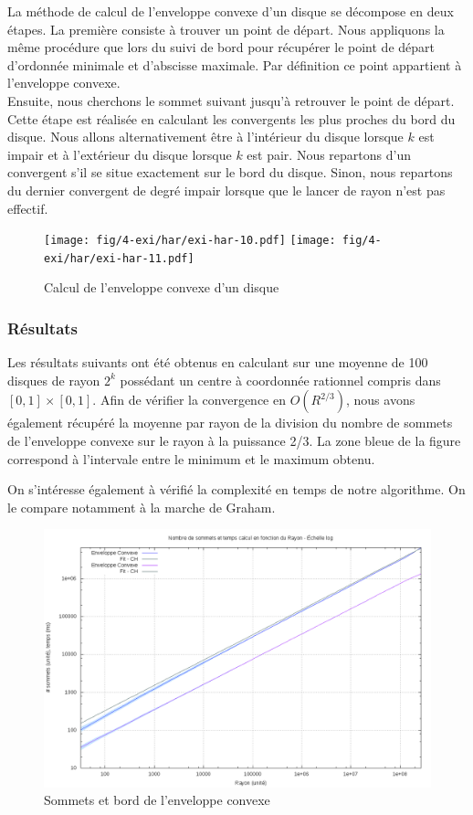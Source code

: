 La méthode de calcul de l'enveloppe convexe d'un disque se décompose en deux étapes. La première consiste à trouver un point de départ. Nous appliquons la même procédure que lors du suivi de bord pour récupérer le point de départ d'ordonnée minimale et d'abscisse maximale. Par définition ce point appartient à l'enveloppe convexe.\\

Ensuite, nous cherchons le sommet suivant jusqu'à retrouver le point de départ. Cette étape est réalisée en calculant les convergents les plus proches du bord du disque. Nous allons alternativement être à l'intérieur du disque lorsque $k$ est impair et à l'extérieur du disque lorsque $k$ est pair. Nous repartons d'un convergent s'il se situe exactement sur le bord du disque. Sinon, nous repartons du dernier convergent de degré impair lorsque que le lancer de rayon n'est pas effectif.\\

\begin{figure}[H]
  \centering
  \texttt{[image: fig/4-exi/har/exi-har-10.pdf]}
  \texttt{[image: fig/4-exi/har/exi-har-11.pdf]}
  \caption{Calcul de l'enveloppe convexe d'un disque}
\end{figure}

\subsubsection{Résultats}

Les résultats suivants ont été obtenus en calculant sur une moyenne de 100 disques de rayon $2^k$ possédant un centre à coordonnée rationnel compris dans $[0,1]\times[0,1]$. Afin de vérifier la convergence en $O(R^{2/3})$, nous avons également récupéré la moyenne par rayon de la division du nombre de sommets de l'enveloppe convexe sur le rayon à la puissance 2/3. La zone bleue de la figure correspond à l'intervale entre le minimum et le maximum obtenu.

On s'intéresse également à vérifié la complexité en temps de notre algorithme. On le compare notamment à la marche de Graham. 

\begin{figure}[H]
  \centering
  \includegraphics[width=\linewidth]{fig/4-exi/ch/exi-ch-sommet.png}
  \caption{Sommets et bord de l'enveloppe convexe}
\end{figure}

